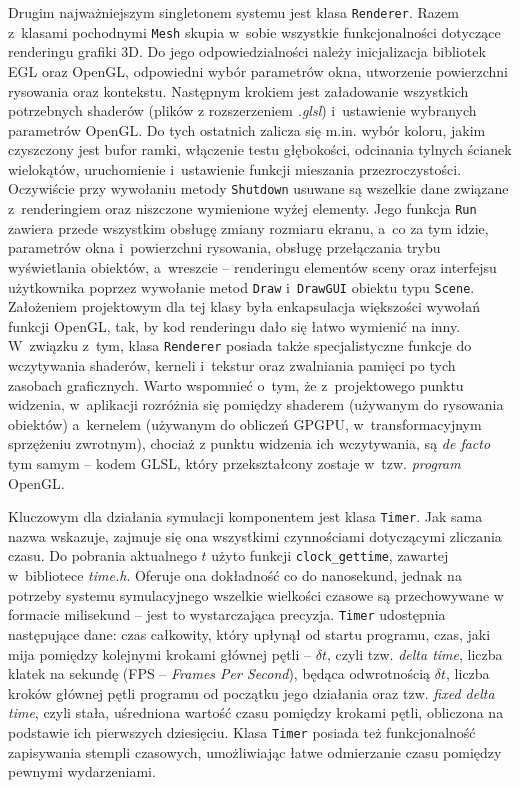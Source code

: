 	Drugim najważniejszym singletonem systemu jest klasa \texttt{Renderer}. Razem z~klasami pochodnymi \texttt{Mesh} skupia w~sobie wszystkie funkcjonalności dotyczące renderingu grafiki 3D. Do jego odpowiedzialności należy inicjalizacja bibliotek EGL oraz OpenGL, odpowiedni wybór parametrów okna, utworzenie powierzchni rysowania oraz kontekstu. Następnym krokiem jest załadowanie wszystkich potrzebnych shaderów (plików z rozszerzeniem \emph{.glsl}) i~ustawienie wybranych parametrów OpenGL. Do tych ostatnich zalicza się m.in. wybór koloru, jakim czyszczony jest bufor ramki, włączenie testu głębokości, odcinania tylnych ścianek wielokątów, uruchomienie i~ustawienie funkcji mieszania przezroczystości. Oczywiście przy wywołaniu metody \texttt{Shutdown} usuwane są wszelkie dane związane z~renderingiem oraz niszczone wymienione wyżej elementy. Jego funkcja \texttt{Run} zawiera przede wszystkim obsługę zmiany rozmiaru ekranu, a~co za tym idzie, parametrów okna i~powierzchni rysowania, obsługę przełączania trybu wyświetlania obiektów, a~wreszcie -- renderingu elementów sceny oraz interfejsu użytkownika poprzez wywołanie metod \texttt{Draw} i~\texttt{DrawGUI} obiektu typu \texttt{Scene}. Założeniem projektowym dla tej klasy była enkapsulacja większości wywołań funkcji OpenGL, tak, by kod renderingu dało się łatwo wymienić na inny. W~związku z~tym, klasa \texttt{Renderer} posiada także specjalistyczne funkcje do wczytywania shaderów, kerneli i~tekstur oraz zwalniania pamięci po tych zasobach graficznych. Warto wspomnieć o~tym, że z~projektowego punktu widzenia, w~aplikacji rozróżnia się pomiędzy shaderem (używanym do rysowania obiektów) a~kernelem (używanym do obliczeń GPGPU, w~transformacyjnym sprzężeniu zwrotnym), chociaż z punktu widzenia ich wczytywania, są \emph{de facto} tym samym -- kodem GLSL, który przekształcony zostaje w~tzw. \emph{program} OpenGL. 
	
	Kluczowym dla działania symulacji komponentem jest klasa \texttt{Timer}. Jak sama nazwa wskazuje, zajmuje się ona wszystkimi czynnościami dotyczącymi zliczania czasu. Do pobrania aktualnego \(t\) użyto funkcji \texttt{clock\_gettime}, zawartej w~bibliotece \emph{time.h}. Oferuje ona dokładność co do nanosekund, jednak na potrzeby systemu symulacyjnego wszelkie wielkości czasowe są przechowywane w formacie milisekund -- jest to wystarczająca precyzja. \texttt{Timer} udostępnia następujące dane: czas całkowity, który upłynął od startu programu, czas, jaki mija pomiędzy kolejnymi krokami głównej pętli -- \(\delta t \), czyli tzw. \emph{delta time}, liczba klatek na sekundę (FPS -- \emph{Frames Per Second}), będąca odwrotnością \(\delta t \), liczba kroków głównej pętli programu od początku jego działania oraz tzw. \emph{fixed delta time}, czyli stała, uśredniona wartość czasu pomiędzy krokami pętli, obliczona na podstawie ich pierwszych dziesięciu. Klasa \texttt{Timer} posiada też funkcjonalność zapisywania stempli czasowych, umożliwiając łatwe odmierzanie czasu pomiędzy pewnymi wydarzeniami.
	
